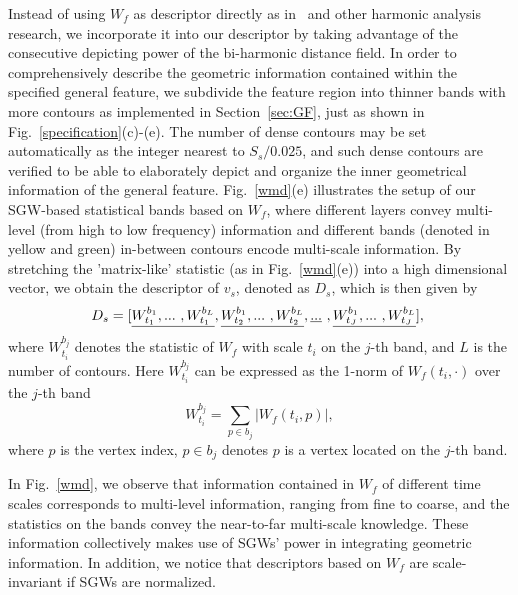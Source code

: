 Instead of using $W_f$ as descriptor directly as in~\cite{Li:2013} and
other harmonic analysis research, we incorporate it into our
descriptor by taking advantage of the consecutive depicting power of
the bi-harmonic distance field. In order to comprehensively describe
the geometric information contained within the specified general
feature, we subdivide the feature region into thinner bands with more
contours as implemented in Section~\ref{sec:GF}, just as shown in
Fig.~\ref{specification}(c)-(e). The number of dense
contours may be set automatically as the integer nearest to
$S_{s}/0.025$, and such dense contours are verified to be able to
elaborately depict and organize the inner geometrical information of
the general feature. Fig.~\ref{wmd}(e) illustrates the setup of our
SGW-based statistical bands based on $W_f$, where different layers
convey multi-level (from high to low frequency) information and
different bands (denoted in yellow and green) in-between contours
encode multi-scale information. By stretching the 'matrix-like'
statistic (as in Fig.~\ref{wmd}(e)) into a high dimensional vector, we
obtain the descriptor of $v_s$, denoted as $D_s$, which is then given
by
\begin{equation}
\label{eq:Des}
\hspace{-1.2mm}
D_s=[\underline{W_{t_1}^{b_1},...\ ,W_{t_1}^{b_L}},\\
\underline{W_{t_2}^{b_1},...\ ,W_{t_2}^{b_L}},\\
\underline{...}\ , \\
\underline{W_{t_J}^{b_1},...\ ,W_{t_J}^{b_L}}],
\end{equation}
where $W_{t_i}^{b_j}$ denotes the statistic of $W_f$ with scale $t_i$
on the $j$-th band, and $L$ is the number of contours. Here $W_{t_i}^{b_j}$
can be expressed as the 1-norm of $W_f(t_i, \cdot)$ over the $j$-th band
\begin{equation}
\label{eq:WMD_sta}
W_{t_i}^{b_j} = \sum_{p \in b_j}| W_f(t_i,p)|,
\end{equation}
where $p$ is the vertex index, $p \in b_j$ denotes $p$ is a vertex
located on the $j$-th band.

In Fig.~\ref{wmd}, we observe that information
contained in $W_f$ of different time scales corresponds to
multi-level information, ranging from fine to coarse, and the
statistics on the bands convey the near-to-far multi-scale
knowledge. These information collectively makes use of SGWs' power
in integrating geometric information. In addition, we notice that
descriptors based on $W_f$ are scale-invariant if SGWs are normalized.


